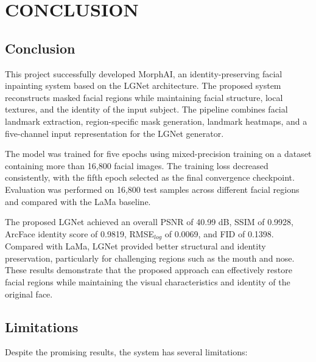 \chapter{CONCLUSION}

\section{Conclusion}

This project successfully developed MorphAI, an identity-preserving facial
inpainting system based on the LGNet architecture. The proposed system
reconstructs masked facial regions while maintaining facial structure, local
textures, and the identity of the input subject. The pipeline combines facial
landmark extraction, region-specific mask generation, landmark heatmaps, and
a five-channel input representation for the LGNet generator.

\noindent The model was trained for five epochs using mixed-precision training on a
dataset containing more than 16,800 facial images. The training loss
decreased consistently, with the fifth epoch selected as the final
convergence checkpoint. Evaluation was performed on 16,800 test samples
across different facial regions and compared with the LaMa baseline.

\noindent The proposed LGNet achieved an overall PSNR of 40.99 dB, SSIM of 0.9928,
ArcFace identity score of 0.9819, RMSE$_{log}$ of 0.0069, and FID of 0.1398.
Compared with LaMa, LGNet provided better structural and identity
preservation, particularly for challenging regions such as the mouth and
nose. These results demonstrate that the proposed approach can effectively
restore facial regions while maintaining the visual characteristics and
identity of the original face.

\section{Limitations}

Despite the promising results, the system has several limitations:

